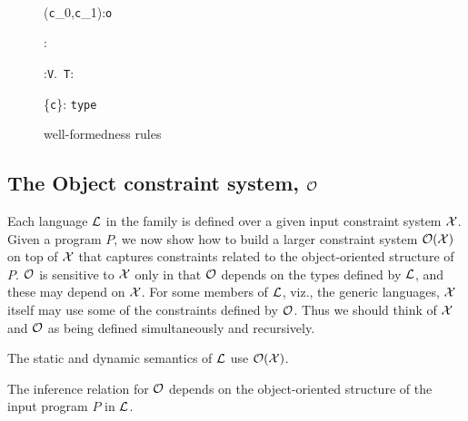 \begin{figure}
\quad\\[-12pt]

	{\Gamma \vdash ({\tt c}_0,{\tt c}_1):{\tt o}}



	{\Gamma {} : \type} 

	{\Gamma \vdash {}:{\tt V}.~{\tt T}: \type} 

	{\Gamma {}\{{\tt c}\}: {\tt type}} 
\caption{\FX{} well-formedness rules}
\end{figure}



\subsection{The Object constraint system, $\cal O$}\label{sec:O}

Each language $\cal L$ in the family is defined over a given input
constraint system $\cal X$.  Given a program $P$, we now show how to
build a larger constraint system ${\cal O}({\cal X})$ on top of $\cal X$
that captures constraints related to the object-oriented structure
of $P$. $\cal O$ is sensitive to $\cal X$ only in that $\cal O$
depends on the types defined by $\cal L$, and these may depend on
$\cal X$.  For some members of $\cal L$, viz., the generic languages,
$\cal X$ itself may use some of the constraints defined by $\cal O$.
Thus we should think of $\cal X$ and $\cal O$ as being defined
simultaneously and recursively.

The static and dynamic semantics of $\cal L$ use ${\cal O}({\cal X})$.

The inference relation for $\cal O$ depends on the object-oriented
structure of the input program $P$ in $\cal L$.  


